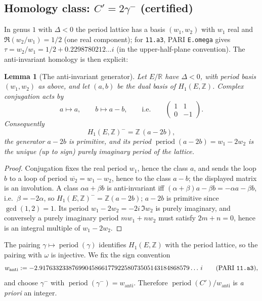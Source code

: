 \documentclass[11pt]{amsart}
\newtheorem{lemma}[theorem]{Lemma}
\theoremstyle{definition}
\theoremstyle{remark}
\newcommand{\Z}{\mathbb{Z}}
\newcommand{\R}{\mathbb{R}}
\DeclareMathOperator{\period}{period}
\begin{document}
\subsection{Homology class: \texorpdfstring{$C'=2\gamma^-$}{C'=2g-} (certified)}
\label{subsec:class}

In genus $1$ with $\Delta<0$ the period lattice has a basis $(w_1,w_2)$
with $w_1$ real and $\Re(w_2/w_1)=1/2$ (one real component); for
\texttt{11.a3}, PARI \texttt{E.omega} gives $\tau=w_2/w_1=1/2+0.2298780212\ldots i$
(in the upper-half-plane convention). The anti-invariant homology is then
explicit:

\begin{lemma}[The anti-invariant generator]\label{lem:antiinv}
Let $E/\R$ have $\Delta<0$, with period basis $(w_1,w_2)$ as above, and let
$(a,b)$ be the dual basis of $H_1(E,\Z)$. Complex conjugation acts by
\[
  a\mapsto a,\qquad b\mapsto a-b,
  \qquad\text{i.e.}\qquad
  \begin{pmatrix}1&1\\0&-1\end{pmatrix}.
\]
Consequently
\[
  H_1(E,\Z)^-=\Z\,(a-2b),
\]
the generator $a-2b$ is primitive, and its period
$\period(a-2b)=w_1-2w_2$ is the unique (up to sign) purely imaginary period
of the lattice.
\end{lemma}

\begin{proof}
Conjugation fixes the real period $w_1$, hence the class $a$, and sends the
loop $b$ to a loop of period $\overline{w_2}=w_1-w_2$, hence to the class
$a-b$; the displayed matrix is an involution. A class $\alpha a+\beta b$ is
anti-invariant iff $(\alpha+\beta)a-\beta b=-\alpha a-\beta b$, i.e.\
$\beta=-2\alpha$, so $H_1(E,\Z)^-=\Z(a-2b)$; $a-2b$ is primitive since
$\gcd(1,2)=1$. Its period $w_1-2w_2=-2i\,\Im w_2$ is purely imaginary, and
conversely a purely imaginary period $mw_1+nw_2$ must satisfy $2m+n=0$,
hence is an integral multiple of $w_1-2w_2$.
\end{proof}

The pairing $\gamma\mapsto\period(\gamma)$ identifies $H_1(E,\Z)$ with the
period lattice, so the pairing with $\omega$ is injective. We fix the sign
convention
{\footnotesize
\[
  w_{\mathrm{anti}}:=-2.9176332338769904586617792258073505143184868579\ldots\,i
  \qquad(\text{PARI \texttt{11.a3}}),
\]}
and choose $\gamma^-$ with $\period(\gamma^-)=w_{\mathrm{anti}}$. Therefore
$\period(C')/w_{\mathrm{anti}}$ is \emph{a priori} an integer.
\end{document}
